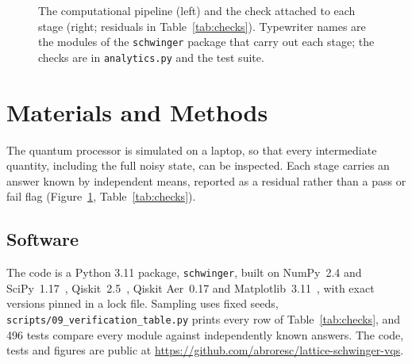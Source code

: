 \begin{figure}[t]
  \caption{The computational pipeline (left) and the check attached to each
  stage (right; residuals in Table~\ref{tab:checks}). Typewriter names are the
  modules of the \texttt{schwinger} package that carry out each stage; the
  checks are in \texttt{analytics.py} and the test suite.}
  \label{fig:pipeline}
\end{figure}

\section{Materials and Methods}
\label{sec:methods}

The quantum processor is simulated on a laptop, so that every intermediate
quantity, including the full noisy state, can be inspected. Each stage carries
an answer known by independent means, reported as a residual rather than a pass
or fail flag (Figure~\ref{fig:pipeline}, Table~\ref{tab:checks}).

\subsection{Software}

The code is a Python 3.11 package, \texttt{schwinger}, built on NumPy~2.4 and
SciPy~1.17~\cite{harris2020,virtanen2020}, Qiskit~2.5~\cite{javadi2024},
Qiskit Aer~0.17 and Matplotlib~3.11~\cite{hunter2007}, with exact versions
pinned in a lock file. Sampling uses fixed seeds,
\texttt{scripts/09\_verification\_table.py} prints every row of
Table~\ref{tab:checks}, and 496 tests compare every module against
independently known answers. The code, tests and figures are public at
\url{https://github.com/abroresc/lattice-schwinger-vqs}.

